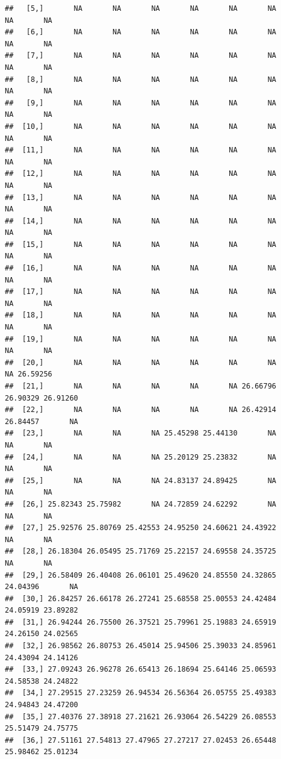 \documentclass{article}\usepackage[]{graphicx}\usepackage[]{color}
\makeatletter
\newenvironment{kframe}{%
 \def\at@end@of@kframe{}%
 \ifinner\ifhmode%
  \def\at@end@of@kframe{\end{minipage}}%
  \begin{minipage}{\columnwidth}%
 \fi\fi%
 \def\FrameCommand##1{\hskip\@totalleftmargin \hskip-\fboxsep
 \colorbox{shadecolor}{##1}\hskip-\fboxsep
     \hskip-\linewidth \hskip-\@totalleftmargin \hskip\columnwidth}%
 \MakeFramed {\advance\hsize-\width
   \@totalleftmargin\z@ \linewidth\hsize
   \@setminipage}}%
 {\par\unskip\endMakeFramed%
 \at@end@of@kframe}
\newenvironment{knitrout}{}{} %
\makeatother
\begin{document}
\begin{knitrout}
\begin{kframe}
\begin{verbatim}
##   [5,]       NA       NA       NA       NA       NA       NA       NA       NA
##   [6,]       NA       NA       NA       NA       NA       NA       NA       NA
##   [7,]       NA       NA       NA       NA       NA       NA       NA       NA
##   [8,]       NA       NA       NA       NA       NA       NA       NA       NA
##   [9,]       NA       NA       NA       NA       NA       NA       NA       NA
##  [10,]       NA       NA       NA       NA       NA       NA       NA       NA
##  [11,]       NA       NA       NA       NA       NA       NA       NA       NA
##  [12,]       NA       NA       NA       NA       NA       NA       NA       NA
##  [13,]       NA       NA       NA       NA       NA       NA       NA       NA
##  [14,]       NA       NA       NA       NA       NA       NA       NA       NA
##  [15,]       NA       NA       NA       NA       NA       NA       NA       NA
##  [16,]       NA       NA       NA       NA       NA       NA       NA       NA
##  [17,]       NA       NA       NA       NA       NA       NA       NA       NA
##  [18,]       NA       NA       NA       NA       NA       NA       NA       NA
##  [19,]       NA       NA       NA       NA       NA       NA       NA       NA
##  [20,]       NA       NA       NA       NA       NA       NA       NA 26.59256
##  [21,]       NA       NA       NA       NA       NA 26.66796 26.90329 26.91260
##  [22,]       NA       NA       NA       NA       NA 26.42914 26.84457       NA
##  [23,]       NA       NA       NA 25.45298 25.44130       NA       NA       NA
##  [24,]       NA       NA       NA 25.20129 25.23832       NA       NA       NA
##  [25,]       NA       NA       NA 24.83137 24.89425       NA       NA       NA
##  [26,] 25.82343 25.75982       NA 24.72859 24.62292       NA       NA       NA
##  [27,] 25.92576 25.80769 25.42553 24.95250 24.60621 24.43922       NA       NA
##  [28,] 26.18304 26.05495 25.71769 25.22157 24.69558 24.35725       NA       NA
##  [29,] 26.58409 26.40408 26.06101 25.49620 24.85550 24.32865 24.04396       NA
##  [30,] 26.84257 26.66178 26.27241 25.68558 25.00553 24.42484 24.05919 23.89282
##  [31,] 26.94244 26.75500 26.37521 25.79961 25.19883 24.65919 24.26150 24.02565
##  [32,] 26.98562 26.80753 26.45014 25.94506 25.39033 24.85961 24.43094 24.14126
##  [33,] 27.09243 26.96278 26.65413 26.18694 25.64146 25.06593 24.58538 24.24822
##  [34,] 27.29515 27.23259 26.94534 26.56364 26.05755 25.49383 24.94843 24.47200
##  [35,] 27.40376 27.38918 27.21621 26.93064 26.54229 26.08553 25.51479 24.75775
##  [36,] 27.51161 27.54813 27.47965 27.27217 27.02453 26.65448 25.98462 25.01234

\end{verbatim}
\end{kframe}
\end{knitrout}
\end{document}
